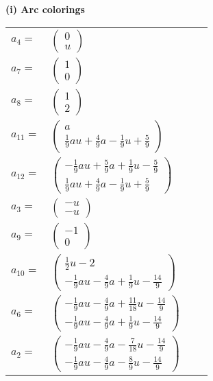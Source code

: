 \documentclass[1p]{elsarticle_modified}
\theoremstyle{definition}
\begin{document}
\flushleft \textbf{(i) Arc colorings}\\
\begin{tabular}{m{7pt} m{180pt} m{7pt} m{180pt} }
\flushright $a_{4}=$&$\begin{pmatrix}0\\u\end{pmatrix}$ \\
\flushright $a_{7}=$&$\begin{pmatrix}1\\0\end{pmatrix}$ \\
\flushright $a_{8}=$&$\begin{pmatrix}1\\2\end{pmatrix}$ \\
\flushright $a_{11}=$&$\begin{pmatrix}a\\\frac{1}{9} a u+\frac{4}{9} a-\frac{1}{9} u+\frac{5}{9}\end{pmatrix}$ \\
\flushright $a_{12}=$&$\begin{pmatrix}-\frac{1}{9} a u+\frac{5}{9} a+\frac{1}{9} u-\frac{5}{9}\\\frac{1}{9} a u+\frac{4}{9} a-\frac{1}{9} u+\frac{5}{9}\end{pmatrix}$ \\
\flushright $a_{3}=$&$\begin{pmatrix}- u\\- u\end{pmatrix}$ \\
\flushright $a_{9}=$&$\begin{pmatrix}-1\\0\end{pmatrix}$ \\
\flushright $a_{10}=$&$\begin{pmatrix}\frac{1}{2} u-2\\-\frac{1}{9} a u-\frac{4}{9} a+\frac{1}{9} u-\frac{14}{9}\end{pmatrix}$ \\
\flushright $a_{6}=$&$\begin{pmatrix}-\frac{1}{9} a u-\frac{4}{9} a+\frac{11}{18} u-\frac{14}{9}\\-\frac{1}{9} a u-\frac{4}{9} a+\frac{1}{9} u-\frac{14}{9}\end{pmatrix}$ \\
\flushright $a_{2}=$&$\begin{pmatrix}-\frac{1}{9} a u-\frac{4}{9} a-\frac{7}{18} u-\frac{14}{9}\\-\frac{1}{9} a u-\frac{4}{9} a-\frac{8}{9} u-\frac{14}{9}\end{pmatrix}$ \\

\end{tabular}
\end{document}
